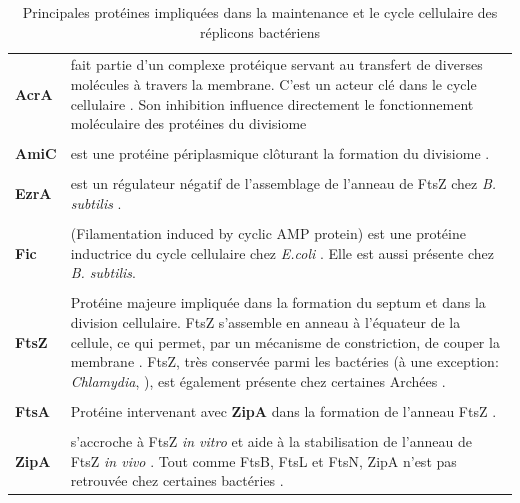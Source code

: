 \begin{longtable}{@{\hspace{-2cm}\hspace{1cm}} >{\bfseries}p{} | >{\small}p{}}
	 \caption[Principales protéines impliquées dans la maintenance et le cycle cellulaire]{Principales protéines impliquées dans la maintenance et le cycle cellulaire des réplicons bactériens}\label{maintenance}\\
	 \endfirsthead
	 AcrA & fait partie d'un complexe protéique servant au transfert de diverses molécules à travers la membrane. C'est un acteur clé dans le cycle cellulaire \citep{lau2005cell}. Son inhibition influence directement le fonctionnement moléculaire des protéines du divisiome \citep{li2011targeting}\\
	\\[-0.2cm]
	 AmiC & est une protéine périplasmique clôturant la formation du divisiome \citep{vicente2006septum}. \\
	\\[-0.2cm]
	 EzrA & est un régulateur négatif de l'assemblage de l'anneau de FtsZ chez \textit{B. subtilis} \citep{yamanaka1996identification}.\\
	\\[-0.2cm]
	 Fic & (Filamentation induced by cyclic AMP protein) est une protéine inductrice du cycle cellulaire chez \textit{E.coli} \citep{kawamukai1989nucleotide}. Elle est aussi présente chez \textit{B. subtilis}.\\
	\\[-0.2cm]
	 FtsZ & Protéine majeure impliquée dans la formation du septum et dans la division cellulaire. FtsZ s'assemble en anneau à l'équateur de la cellule, ce qui permet, par un mécanisme de constriction, de couper la membrane \citep{thanbichler2010}. FtsZ, très conservée parmi les bactéries (à une exception: \textit{Chlamydia}, \citep{li2011targeting}), est également présente chez certaines Archées \citep{vicente2006septum}.\\
	\\[-0.2cm]
	  FtsA & Protéine intervenant avec \textbf{ZipA} dans la formation de l'anneau FtsZ \citep{vicente2006septum}.\\
	\\[-0.2cm]
	  ZipA & s'accroche à FtsZ \textit{in vitro} et aide à la stabilisation de l'anneau de FtsZ \textit{in vivo} \citep{li2011targeting}. Tout comme FtsB, FtsL et FtsN, ZipA n'est pas retrouvée chez certaines bactéries \citep{li2011targeting}.\\

\end{longtable}
